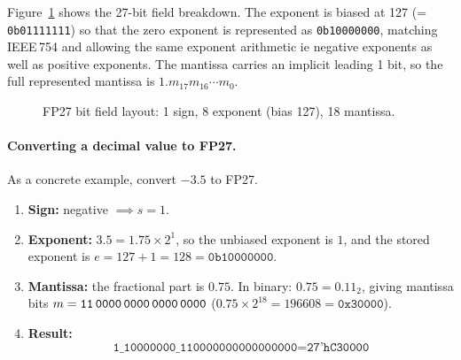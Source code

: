 Figure~\ref{fig:fp27_bits} shows the 27-bit field breakdown. The exponent is
biased at 127 (= \texttt{0b01111111}) so that the zero exponent is represented
as \texttt{0b10000000}, matching IEEE\,754 and allowing the same exponent
arithmetic ie negative exponents as well as positive exponents. The mantissa carries an implicit leading 1 bit, so the full
represented mantissa is $1.m_{17}m_{16}\cdots m_0$.

\begin{figure}[htbp]
\centering
{}
\caption{FP27 bit field layout: 1 sign, 8 exponent (bias 127), 18 mantissa.}
\label{fig:fp27_bits}
\end{figure}

\FloatBarrier

\paragraph{Converting a decimal value to FP27.}\newline
As a concrete example, convert $-3.5$ to FP27.
\begin{enumerate}[noitemsep]
    \item \textbf{Sign:} negative $\implies s = 1$.
    \item \textbf{Exponent:} $3.5 = 1.75 \times 2^1$, so the unbiased exponent
          is $1$, and the stored exponent is $e = 127 + 1 = 128 =
          \texttt{0b10000000}$.
    \item \textbf{Mantissa:} the fractional part is $0.75$. In binary:
          $0.75 = 0.11_2$, giving mantissa bits $m = \texttt{11\,0000\,0000\,0000\,0000}$
          ($0.75 \times 2^{18} = 196608 = \texttt{0x30000}$).
    \item \textbf{Result:}
          \[
              \texttt{1\_10000000\_110000000000000000} = \texttt{27'hC30000}
          \]
\end{enumerate}

